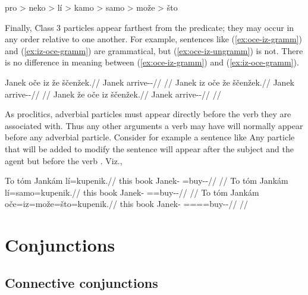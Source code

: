 \pex
	{\small
		pro > neko > lí > kamo > samo > može > što
	}
\xe

Finally, Class 3 particles appear farthest from the predicate; they may occur in
any order relative to one another. For example, sentences like
(\ref{ex:oce-iz-gramm}) and (\ref{ex:iz-oce-gramm}) are grammatical, but
(\ref{ex:oce-iz-ungramm}) is not. There is no difference in meaning between
(\ref{ex:oce-iz-gramm}) and (\ref{ex:iz-oce-gramm}).

\pex
\a\label{ex:oce-iz-gramm}
\begingl
	\gla Janek oče iz že ščenžek.//
	\glb Janek \Mir{} \Infer{} \Pfv{} arrive-\Av{}-\Pf{}//
	\glft {}//
\endgl
\a\label{ex:iz-oce-gramm}
\begingl
	\gla Janek iz oče že ščenžek.//
	\glb Janek \Infer{} \Mir{} \Pfv{} arrive-\Av{}-\Pf{}//
	\glft {}//
\endgl
\a\label{ex:oce-iz-ungramm}
\begingl
	\gla \ljudge{*}Janek že oče iz ščenžek.//
	\glb Janek \Pfv{} \Mir{} \Infer{} arrive-\Av{}-\Pf{}//
	\glft {}//
\endgl
\xe

As proclitics, adverbial particles must appear directly before the verb they are
associated with. Thus any other arguments a verb may have will normally appear
before any adverbial particle. Consider for example a sentence like   Any particle that will be
added to modify the sentence will appear after the subject  and the
agent  but before the verb . Viz.,

\pex
\a
\begingl
	\gla To tóm Jankám lí=kupenik.//
	\glb this book Janek-\Agt{} \Q{}=buy-\Pv{}-\Pf{}//
	\glft {}//
\endgl
\a
\begingl
	\gla To tóm Jankám lí=samo=kupenik.//
	\glb this book Janek-\Agt{} \Q{}=\Excl{}=buy-\Pv{}-\Pf{}//
	\glft {}//
\endgl
\a
\begingl
	\gla To tóm Jankám oče=iz=može=što=kupenik.//
	\glb this book Janek-\Agt{} \Mir{}=\Infer{}=\Add{}=\Aff{}=buy-\Pv{}-\Pf{}//
	\glft {}//
\endgl
\xe


\section{Conjunctions}\label{sec:conj}

\subsection{Connective conjunctions}\label{sec:conn-conj}

